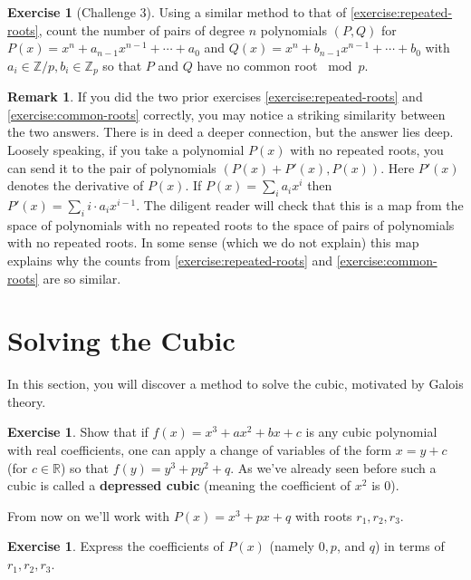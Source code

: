 \documentclass[reqno, 12pt, letter]{article}
\theoremstyle{plain}
\theoremstyle{definition}
\newtheorem{remark}[theorem]{Remark}
\newtheorem{exercise}[theorem]{Exercise}
\theoremstyle{remark}
\numberwithin{equation}{section}
\newcommand\br{{\mathbb R}}
\newcommand\bz{{\mathbb Z}}
\begin{document}
\begin{exercise}[Challenge 3]
	\label{exercise:common-roots}
	Using a similar method to that of \autoref{exercise:repeated-roots},
	count the number of pairs of degree $n$ polynomials $(P,Q)$ for 
	$P(x) = x^n + a_{n-1}x^{n-1} + \cdots + a_0$ and $Q(x) = x^n + b_{n-1}x^{n-1} + \cdots + b_0$
	with $a_i \in \bz/p, b_i \in \bz_p$ so that $P$ and $Q$ have no common root $\bmod p$.
\end{exercise}
\begin{remark}
	\label{remark:}
	If you did the two prior exercises \autoref{exercise:repeated-roots} and \autoref{exercise:common-roots} correctly, you may notice a striking similarity
between the two answers. There is in deed a deeper connection, but the answer lies deep.
Loosely speaking, if you take a polynomial $P(x)$ with no repeated roots, you can send it
to the pair of polynomials $(P(x) + P'(x), P(x))$. Here $P'(x)$ denotes the derivative of $P(x)$.
If $P(x) = \sum_i a_ix^i$ then $P'(x) = \sum_i  i \cdot a_i x^{i-1}$.
The diligent reader will check that this is a map from the space of polynomials with no repeated roots to the
space of pairs of polynomials with no repeated roots.
In some sense (which we do not explain) this map explains why the counts from 
\autoref{exercise:repeated-roots} and \autoref{exercise:common-roots} are so similar.
\end{remark}



\newpage
\section{Solving the Cubic}
	In this section, you will discover a method to solve the cubic, motivated by Galois theory.
	
	\begin{exercise}
		\label{exercise:}
		Show that if $f(x) = x^3 + ax^2 +bx +c$ is any cubic polynomial with real coefficients, one can apply
		a change of variables of the form $x = y + c$ (for $c \in \br$)
		so that $f(y) = y^3 + py^2 + q$.
		As we've already seen before such a cubic is called a {\bf depressed cubic} (meaning the coefficient of $x^2$ is $0$).
	\end{exercise}

	From now on we'll work with $P(x) = x^3 + px + q$ with roots $ r_1, r_2, r_3$.
	
	\begin{exercise}
	\label{exercise:coefficients_depressed_cubic}
	Express the coefficients of $P(x)$ (namely $ 0,p$, and $q$) in terms of $ r_1, r_2, r_3$.
	\end{exercise}
\end{document}

